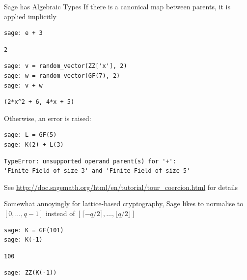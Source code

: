 \documentclass[presentation,smaller]{beamer}
\begin{document}
\begin{frame}{Sage has Algebraic Types}
If there is a canonical map between parents, it is applied implicitly

\lstset{language=sage,label= ,caption= ,captionpos=b,numbers=none}
\begin{lstlisting}
sage: e + 3
\end{lstlisting}

\begin{verbatim}
2
\end{verbatim}

\lstset{language=sage,label= ,caption= ,captionpos=b,numbers=none}
\begin{lstlisting}
sage: v = random_vector(ZZ['x'], 2)
sage: w = random_vector(GF(7), 2)
sage: v + w
\end{lstlisting}

\begin{verbatim}
(2*x^2 + 6, 4*x + 5)
\end{verbatim}

\framebreak

Otherwise, an error is raised:

\lstset{language=sage,label= ,caption= ,captionpos=b,numbers=none}
\begin{lstlisting}
sage: L = GF(5)
sage: K(2) + L(3)
\end{lstlisting}

\begin{verbatim}
TypeError: unsupported operand parent(s) for '+': 
'Finite Field of size 3' and 'Finite Field of size 5'
\end{verbatim}

See \url{http://doc.sagemath.org/html/en/tutorial/tour\_coercion.html} for details

\framebreak

Somewhat annoyingly for lattice-based cryptography, Sage likes to normalise to \([0,\ldots,q-1]\) instead of \([\lceil -q/2 \rceil,\ldots, \lfloor q/2 \rfloor]\)

\lstset{language=sage,label= ,caption= ,captionpos=b,numbers=none}
\begin{lstlisting}
sage: K = GF(101)
sage: K(-1)
\end{lstlisting}

\begin{verbatim}
100
\end{verbatim}

\lstset{language=sage,label= ,caption= ,captionpos=b,numbers=none}
\begin{lstlisting}
sage: ZZ(K(-1))
\end{lstlisting}


\end{frame}
\end{document}

